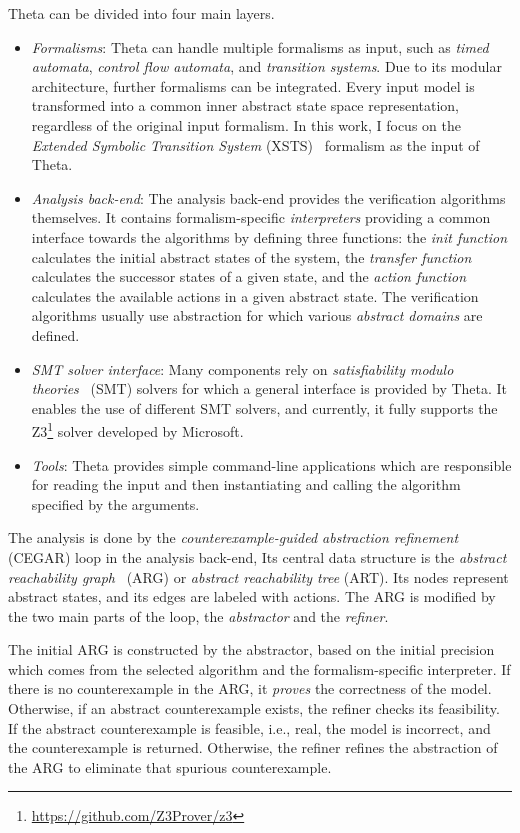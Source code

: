 Theta can be divided into four main layers.

\begin{itemize}
    \item \textit{Formalisms}: Theta can handle multiple formalisms as input, such as \textit{timed automata}, \textit{control flow automata}, and \textit{transition systems}. Due to its modular architecture, further formalisms can be integrated. Every input model is transformed into a common inner abstract state space representation, regardless of the original input formalism. In this work, I focus on the \textit{Extended Symbolic Transition System} (XSTS)~\cite{XSTS} formalism as the input of Theta.
    \item \textit{Analysis back-end}: The analysis back-end provides the verification algorithms themselves. It contains formalism-specific \textit{interpreters} providing a common interface towards the algorithms by defining three functions: the \textit{init function} calculates the initial abstract states of the system, the \textit{transfer function} calculates the successor states of a given state, and the \textit{action function} calculates the available actions in a given abstract state. The verification algorithms usually use abstraction for which various \textit{abstract domains} are defined.
    \item \textit{SMT solver interface}: Many components rely on \textit{satisfiability modulo theories}~\cite{smt} (SMT) solvers for which a general interface is provided by Theta. It enables the use of different SMT solvers, and currently, it fully supports the Z3\footnote{\url{https://github.com/Z3Prover/z3}} solver developed by Microsoft.
    \item \textit{Tools}: Theta provides simple command-line applications which are responsible for reading the input and then instantiating and calling the algorithm specified by the arguments.
\end{itemize}

The analysis is done by the \textit{counterexample-guided abstraction refinement} (CEGAR) loop in the analysis back-end, Its central data structure is the \textit{abstract reachability graph}~\cite{theta-arg} (ARG) or \textit{abstract reachability tree} (ART). Its nodes represent abstract states, and its edges are labeled with actions. The ARG is modified by the two main parts of the loop, the \textit{abstractor} and the \textit{refiner}.

The initial ARG is constructed by the abstractor, based on the initial precision which comes from the selected algorithm and the formalism-specific interpreter. If there is no counterexample in the ARG, it \textit{proves} the correctness of the model. Otherwise, if an abstract counterexample exists, the refiner checks its feasibility. If the abstract counterexample is feasible, i.e., real, the model is incorrect, and the counterexample is returned. Otherwise, the refiner refines the abstraction of the ARG to eliminate that spurious counterexample.
